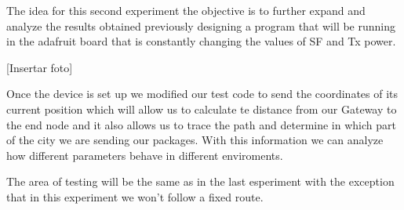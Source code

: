 The idea for this second experiment the objective is to further expand and analyze the results obtained previously 
designing a program that will be running in the adafruit board that is constantly changing the values of SF and Tx power. 

[Insertar foto]

Once the device is set up we modified our test code to send the coordinates of its current position 
which will allow us to calculate te distance from our Gateway to the end node and it also allows us 
to trace the path and determine in which part of the city we are sending our packages. With this 
information we can analyze how different parameters behave in different enviroments.

The area of testing will be the same as in the last esperiment with the exception that in this experiment
we won't follow a fixed route.
